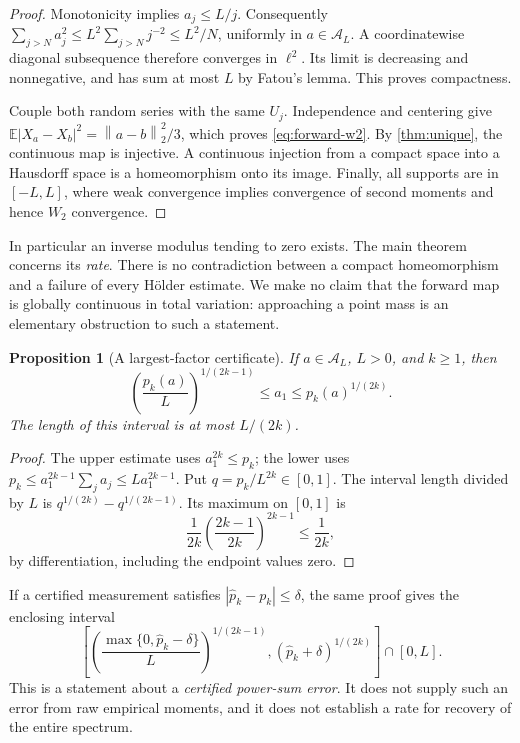 \documentclass[11pt,a4paper]{article}
\newtheorem{proposition}[theorem]{Proposition}
\theoremstyle{definition}
\theoremstyle{remark}
\newcommand{\E}{\mathbb E}
\newcommand{\A}{\mathcal A}
\newcommand{\norm}[1]{\left\lVert #1\right\rVert}
\begin{document}
\begin{proof}
Monotonicity implies $a_j\le L/j$. Consequently
$\sum_{j>N}a_j^2\le L^2\sum_{j>N}j^{-2}\le L^2/N$, uniformly in
$a\in\A_L$. A coordinatewise diagonal subsequence therefore converges in
$\ell^2$. Its limit is decreasing and nonnegative, and has sum at most $L$
by Fatou's lemma. This proves compactness.

Couple both random series with the same $U_j$. Independence and centering
give $\E|X_a-X_b|^2=\norm{a-b}_2^2/3$, which proves
\eqref{eq:forward-w2}. By \cref{thm:unique}, the continuous map is
injective. A continuous injection from a compact space into a Hausdorff
space is a homeomorphism onto its image. Finally, all supports are in
$[-L,L]$, where weak convergence implies convergence of second moments
and hence $W_2$ convergence.
\end{proof}

In particular an inverse modulus tending to zero exists. The main theorem
concerns its \emph{rate}. There is no contradiction between a compact
homeomorphism and a failure of every H\"older estimate. We make no claim that
the forward map is globally continuous in total variation: approaching a
point mass is an elementary obstruction to such a statement.

\begin{proposition}[A largest-factor certificate]\label{prop:largest}
If $a\in\A_L$, $L>0$, and $k\ge1$, then
\begin{equation}\label{eq:largest}
 \left(\frac{p_k(a)}L\right)^{1/(2k-1)}
       \le a_1\le p_k(a)^{1/(2k)}.
\end{equation}
The length of this interval is at most $L/(2k)$.
\end{proposition}

\begin{proof}
The upper estimate uses $a_1^{2k}\le p_k$; the lower uses
$p_k\le a_1^{2k-1}\sum_j a_j\le La_1^{2k-1}$.
Put $q=p_k/L^{2k}\in[0,1]$. The interval length divided by $L$ is
$q^{1/(2k)}-q^{1/(2k-1)}$. Its maximum on $[0,1]$ is
\[
 \frac1{2k}\left(\frac{2k-1}{2k}\right)^{2k-1}\le\frac1{2k},
\]
by differentiation, including the endpoint values zero.
\end{proof}

If a certified measurement satisfies $|\widehat p_k-p_k|\le\delta$, the
same proof gives the enclosing interval
\[
 \left[
  \left(\frac{\max\{0,\widehat p_k-\delta\}}{L}\right)^{1/(2k-1)},
  (\widehat p_k+\delta)^{1/(2k)}
 \right]\cap[0,L].
\]
This is a statement about a \emph{certified power-sum error}. It does not
supply such an error from raw empirical moments, and it does not establish
a rate for recovery of the entire spectrum.
\end{document}
